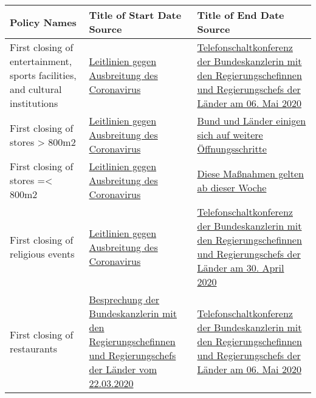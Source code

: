 
\begin{table}[hbt!]
\centering
{
 \begin{tabular}{|| L | L | L ||}
 \hline
 \bf{Policy Names} &  \bf{Title of Start Date Source} &  \bf{Title of End Date Source} \\ [0.5ex]
 \hline\hline

First closing of entertainment, sports facilities, and cultural institutions & \href{https://www.bundesregierung.de/breg-de/themen/coronavirus/leitlinien-bund-laender-1731000}{Leitlinien gegen Ausbreitung des Coronavirus} & \href{https://www.bundesregierung.de/breg-de/suchetelefonschaltkonferenz-der-bundeskanzlerin-mit-den-regierungschefinnen-und-regierungschefs-der-laender-am-06-mai-2020-1750988}{Telefonschaltkonferenz der Bundeskanzlerin mit den Regierungschefinnen und Regierungschefs der Länder am 06. Mai 2020} \\

First closing of stores > 800m2 & \href{https://www.bundesregierung.de/breg-de/themen/coronavirus/leitlinien-bund-laender-1731000}{Leitlinien gegen Ausbreitung des Coronavirus} & \href{https://www.bundesregierung.de/breg-de/suche/bund-laender-beschluss-1750766}{Bund und Länder einigen sich auf weitere Öffnungsschritte} \\

First closing of stores =< 800m2 & \href{https://www.bundesregierung.de/breg-de/themen/coronavirus/leitlinien-bund-laender-1731000}{Leitlinien gegen Ausbreitung des Coronavirus}  & \href{https://www.bundesregierung.de/breg-de/suche/aktuelle-massnahmen-1745170}{Diese Maßnahmen gelten ab dieser Woche}  \\

First closing of religious events & \href{https://www.bundesregierung.de/breg-de/themen/coronavirus/leitlinien-bund-laender-1731000}{Leitlinien gegen Ausbreitung des Coronavirus} & \href{https://www.bundesregierung.de/breg-de/suche/telefonschaltkonferenz-der-bundeskanzlerin-mit-den-regierungschefinnen-und-regierungschefs-der-laender-am-30-april-2020-1749798}{Telefonschaltkonferenz der Bundeskanzlerin mit den Regierungschefinnen und Regierungschefs der Länder am 30. April 2020} \\

First closing of restaurants & \href{https://www.bundesregierung.de/breg-de/themen/coronavirus/besprechung-der-bundeskanzlerin-mit-den-regierungschefinnen-und-regierungschefs-der-laender-vom-22-03-2020-1733248}{Besprechung der Bundeskanzlerin mit den Regierungschefinnen und Regierungschefs der Länder vom 22.03.2020} & \href{https://www.bundesregierung.de/breg-de/suche/telefonschaltkonferenz-der-bundeskanzlerin-mit-den-regierungschefinnen-und-regierungschefs-der-laender-am-06-mai-2020-1750988}{Telefonschaltkonferenz der Bundeskanzlerin mit den Regierungschefinnen und Regierungschefs der Länder am 06. Mai 2020} \\


\end{tabular}}
\end{table}
